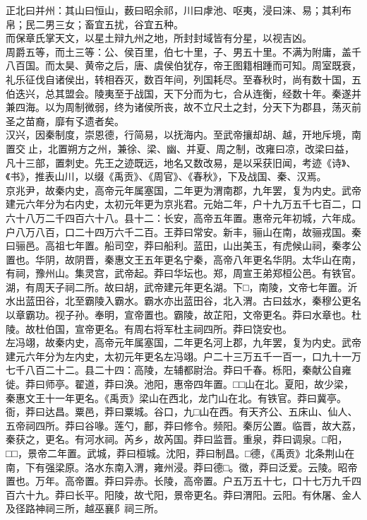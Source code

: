 \documentclass[]{article}
\begin{document}
正北曰并州：其山曰恒山，薮曰昭余祁，川曰虖池、呕夷，浸曰涞、易；其利布帛；民二男三女；畜宜五扰，谷宜五种。\\
而保章氏掌天文，以星土辩九州之地，所封封域皆有分星，以视吉凶。\\
周爵五等，而土三等：公、侯百里，伯七十里，子、男五十里。不满为附庸，盖千八百国。而太昊、黄帝之后，唐、虞侯伯犹存，帝王图籍相踵而可知。周室既衰，礼乐征伐自诸侯出，转相吞灭，数百年间，列国耗尽。至春秋时，尚有数十国，五伯迭兴，总其盟会。陵夷至于战国，天下分而为七，合从连衡，经数十年。秦遂并兼四海。以为周制微弱，终为诸侯所丧，故不立尺土之封，分天下为郡县，荡灭前圣之苗裔，靡有孓遗者矣。\\
汉兴，因秦制度，崇恩德，行简易，以抚海内。至武帝攘却胡、越，开地斥境，南置交止，北置朔方之州，兼徐、梁、幽、并夏、周之制，改雍曰凉，改梁曰益，凡十三部，置刺史。先王之迹既远，地名又数改易，是以采获旧闻，考迹《诗》、《书》，推表山川，以缀《禹贡》、《周官》、《春秋》，下及战国、秦、汉焉。\\
京兆尹，故秦内史，高帝元年属塞国，二年更为渭南郡，九年罢，复为内史。武帝建元六年分为右内史，太初元年更为京兆君。元始二年，户十九万五千七百二，口六十八万二千四百六十八。县十二：长安，高帝五年置。惠帝元年初城，六年成。户八万八百，口二十四万六千二百。王莽曰常安。新丰，骊山在南，故骊戎国。秦曰骊邑。高祖七年置。船司空，莽曰船利。蓝田，山出美玉，有虎候山祠，秦孝公置也。华阴，故阴晋，秦惠文王五年更名宁秦，高帝八年更名华阴。太华山在南，有祠，豫州山。集灵宫，武帝起。莽曰华坛也。郑，周宣王弟郑桓公邑。有铁官。湖，有周天子祠二所。故曰胡，武帝建元年更名湖。下□，南陵，文帝七年置。沂水出蓝田谷，北至霸陵入霸水。霸水亦出蓝田谷，北入渭。古曰兹水，秦穆公更名以章霸功。视子孙。奉明，宣帝置也。霸陵，故芷阳，文帝更名。莽曰水章也。杜陵。故杜伯国，宣帝更名。有周右将军杜主祠四所。莽曰饶安也。\\
左冯翊，故秦内史，高帝元年属塞国，二年更名河上郡，九年罢，复为内史。武帝建元六年分为左内史，太初元年更名左冯翊。户二十三万五千一百一，口九十一万七千八百二十二。县二十四：高陵，左辅都尉治。莽曰千春。栎阳，秦献公自雍徙。莽曰师亭。翟道，莽曰涣。池阳，惠帝四年置。□□山在北。夏阳，故少梁，秦惠文王十一年更名。《禹贡》梁山在西北，龙门山在北。有铁官。莽曰冀亭。衙，莽曰达昌。粟邑，莽曰粟城。谷口，九□山在西。有天齐公、五床山、仙人、五帝祠四所。莽曰谷喙。莲勺，鄜，莽曰修令。频阳。秦厉公置。临晋，故大荔，秦获之，更名。有河水祠。芮乡，故芮国。莽曰监晋。重泉，莽曰调泉。□阳，□□，景帝二年置。武城，莽曰桓城。沈阳，莽曰制昌。□德，《禹贡》北条荆山在南，下有强梁原。洛水东南入渭，雍州浸。莽曰德□。徵，莽曰泛爱。云陵。昭帝置也。万年。高帝置。莽曰异赤。长陵，高帝置。户五万五十七，口十七万九千四百六十九。莽曰长平。阳陵，故弋阳，景帝更名。莽曰渭阳。云阳。有休屠、金人及径路神祠三所，越巫襄阝祠三所。\\
\end{document}
